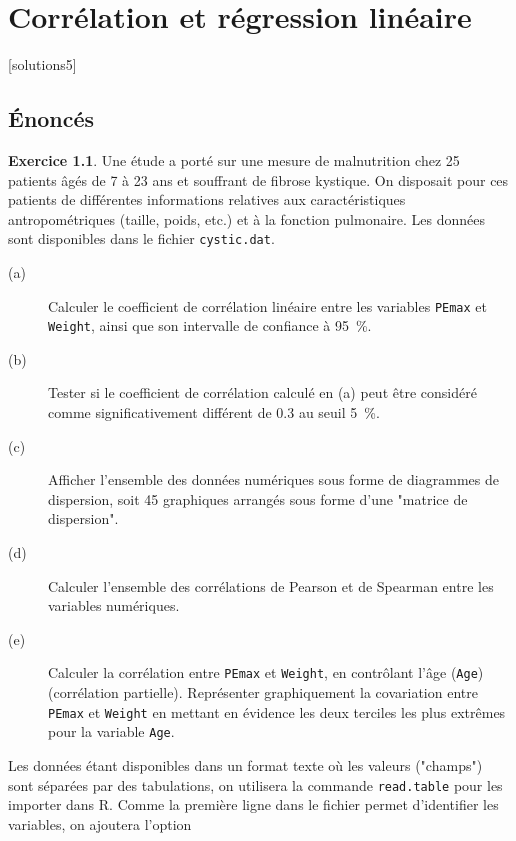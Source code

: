 \documentclass[11pt]{report}
\theoremstyle{definition}
\newtheorem{exo}{Exercice}[chapter]
\newcommand{\R}{\textsf{R}\xspace}
\begin{document}
\chapter{Corrélation et régression linéaire}\label{chap:reg}
[solutions5]

\section*{Énoncés}
%
%
\begin{exo}\label{exo:5.1}
Une étude a porté sur une mesure de malnutrition chez 25 patients âgés de 7
à 23 ans et souffrant de fibrose kystique. On disposait pour ces patients de
différentes informations relatives aux caractéristiques antropométriques
(taille, poids, etc.) et à la fonction pulmonaire. \autocite[p.~180]{everitt01}
Les données sont disponibles dans le fichier \texttt{cystic.dat}.
\begin{description}
\item[(a)] Calculer le coefficient de corrélation linéaire entre les
  variables \texttt{PEmax} et \texttt{Weight}, ainsi que son intervalle de
  confiance à 95~\%.
\item[(b)] Tester si le coefficient de corrélation calculé en (a) peut être
  considéré comme significativement différent de 0.3 au seuil 5~\%.
\item[(c)] Afficher l'ensemble des données numériques sous forme de
  diagrammes de dispersion, soit 45 graphiques arrangés sous forme d'une
  "matrice de dispersion".
\item[(d)] Calculer l'ensemble des corrélations de Pearson et de Spearman
  entre les variables numériques. 
\item[(e)] Calculer la corrélation entre \texttt{PEmax} et \texttt{Weight},
  en contrôlant l'âge (\texttt{Age}) (corrélation partielle). Représenter
  graphiquement la covariation entre \texttt{PEmax} et \texttt{Weight} en
  mettant en évidence les deux terciles les plus extrêmes pour la variable
  \texttt{Age}. 
\end{description}
\begin{sol}
Les données étant disponibles dans un format texte où les valeurs ("champs")
sont séparées par des tabulations, on utilisera la commande
\texttt{read.table} pour les importer dans \R. Comme la première ligne dans
le fichier permet d'identifier les variables, on ajoutera l'option

\end{sol}
\end{exo}
\end{document}
